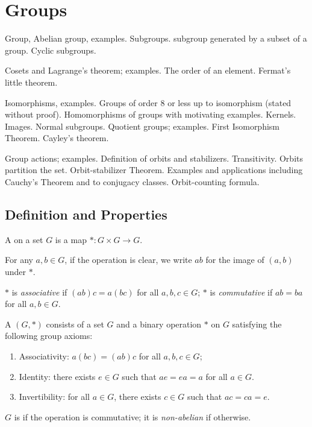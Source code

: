 \chapter{Groups}\label{chap:groups}
\begin{summary}
\item Group, Abelian group, examples. Subgroups. subgroup generated by a subset of a group. Cyclic subgroups.
\item Cosets and Lagrange's theorem; examples. The
order of an element. Fermat's little theorem.
\item Isomorphisms, examples. Groups of order 8 or less up to isomorphism (stated without
proof). Homomorphisms of groups with motivating examples. Kernels. Images. Normal subgroups. Quotient groups; examples. First Isomorphism Theorem. Cayley's theorem.
\item Group actions; examples. Definition of orbits and stabilizers. Transitivity. Orbits partition the set. Orbit-stabilizer Theorem. Examples and applications including Cauchy's Theorem and to conjugacy classes. Orbit-counting formula.
\end{summary}

\section{Definition and Properties}
\begin{definition}
A  on a set $G$ is a map $\ast:G\times G\to G$. 
\end{definition}

\begin{notation}
For any $a,b\in G$, if the operation is clear, we write $ab$ for the image of $(a,b)$ under $\ast$.
\end{notation}

$\ast$ is \emph{associative} if $(ab)c=a(bc)$ for all $a,b,c\in G$; 
$\ast$ is \emph{commutative} if $ab=ba$ for all $a,b\in G$.

\begin{definition}[Group]
A  $(G,\ast)$ consists of a set $G$ and a binary operation $\ast$ on $G$ satisfying the following group axioms:
\begin{enumerate}[label=(\roman*)]
\item Associativity: $a(bc)=(ab)c$ for all $a,b,c\in G$;\
\item Identity: there exists $e\in G$ such that $ae=ea=a$ for all $a\in G$.
\item Invertibility: for all $a\in G$, there exists $c\in G$ such that $ac=ca=e$.
\end{enumerate}

$G$ is  if the operation is commutative; it is \emph{non-abelian} if otherwise.
\end{definition}

